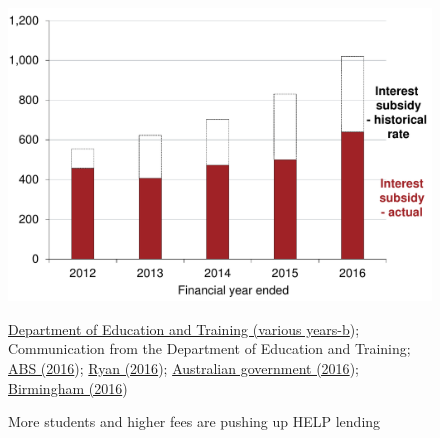 \documentclass[embargoed]{grattan}
\begin{document}
\begin{figure}
\caption[More students and higher fees are pushing up {HELP} lending]{More students and higher fees are pushing up \gls{HELP} lending}\label{fig:fig4-more-students-higher-fees-are-pushing-up-HELP-lending}
\includegraphics[page=4]{atlas/Chartpack.pdf}

%
{\protect\hyperlink{_ENREF_36}{Department of Education and Training (various years-b}); Communication from the Department of Education and Training; \protect\hyperlink{_ENREF_6}{ABS (2016}); \protect\hyperlink{_ENREF_71}{Ryan (2016}); \protect\hyperlink{_ENREF_13}{Australian government (2016}); \protect\hyperlink{_ENREF_12}{Birmingham (2016})}
\end{figure}
\end{document}
